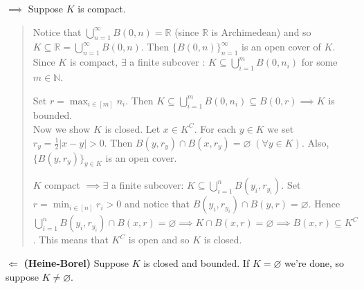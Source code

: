\documentclass[11pt]{article}
\begin{document}
$\implies$ Suppose $K$ is compact.
\begin{quote}\vspace{-0.3cm}
Notice that $\bigcup_{n=1}^\infty B(0, n) = \mathbb{R}$ (since $\mathbb{R}$ is Archimedean) and so $K \subseteq \mathbb{R} = \bigcup_{n=1}^\infty B(0, n)$. Then $\{B(0, n)\}_{n=1}^\infty$ is an open cover of $K$. Since $K$ is compact, $\exists$ a finite subcover : $K \subseteq \bigcup_{i=1}^m B(0, n_i)$ for some $m \in \mathbb{N}$.

Set $r = \max_{i \in [m]} n_i$. Then $K \subseteq \bigcup_{i=1}^m B(0, n_i) \subseteq B(0, r) \implies K$ is bounded.\\

Now we show $K$ is closed. Let $x \in K^C$. For each $y \in K$ we set $r_y = \frac{1}{2}|x-y| > 0$. Then $B(y, r_y) \cap B(x, r_y) = \varnothing \;(\forall y \in K)$. Also, $\{B(y, r_y)\}_{y \in K}$ is an open cover.

$K$ compact $\implies \exists$ a finite subcover: $K \subseteq \bigcup_{i=1}^n B(y_i, r_{y_i})$. Set $r = \min_{i \in [n]} r_i > 0$ and notice that $B(y_i, r_{y_i}) \cap B(y, r) = \varnothing$. Hence $\bigcup_{i=1}^n B(y_i, r_{y_i}) \cap B(x,r) = \varnothing \implies K \cap B(x,r) = \varnothing \implies B(x,r) \subseteq K^C$. This means that $K^C$ is open and so $K$ is closed.
\end{quote}
$\Longleftarrow$ \textbf{(Heine-Borel)} Suppose $K$ is closed and bounded. If $K = \varnothing$ we're done, so suppose $K \neq \varnothing$.
\end{document}

